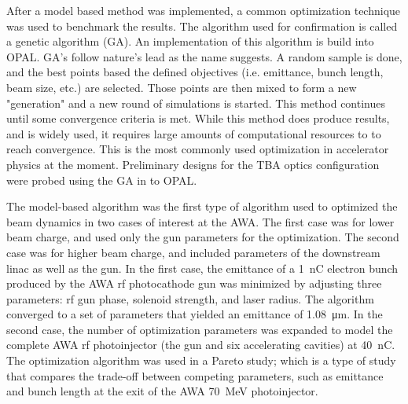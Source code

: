 After a model based method was implemented, 
a common optimization technique was used to benchmark the results. 
The algorithm used for confirmation 
is called a genetic algorithm (GA). An implementation of this algorithm is
build into OPAL. GA's follow nature's lead as the name suggests.
A random sample is done, and the best points based the defined objectives
(i.e. emittance, bunch length, beam size, etc.)
are selected. Those points are then mixed to form a new "generation"
and a new round of simulations is started. This method continues
until some convergence criteria is met. While this method does 
produce results, and is widely used, it requires large amounts 
of computational resources to to reach convergence.
This is the most commonly used optimization in accelerator physics
at the moment. Preliminary designs 
for the TBA optics configuration were probed using the GA in to OPAL. 



The model-based algorithm was the first type of algorithm used to optimized the beam dynamics 
in two cases of interest at the AWA.
The first case was for lower beam charge, and used only the gun parameters for the optimization.  
The second case was for higher beam charge, and included parameters of the downstream linac as well as the gun.
In the first case,  the emittance of a \SI{1}{nC} electron 
bunch produced by the AWA rf photocathode gun 
was minimized by adjusting three parameters: rf gun phase, 
solenoid strength, and laser radius. The algorithm 
converged to a set of parameters that yielded an
emittance of \SI{1.08}{\um}. In the second case, 
the number of optimization parameters was expanded to model the complete AWA rf 
photoinjector (the gun and six accelerating cavities) at \SI{40}{nC}. 
The optimization algorithm was used in a Pareto study; which is a type of study that compares the 
trade-off between competing parameters, such as emittance and bunch 
length at the exit of the AWA \SI{70}{MeV} photoinjector. 

